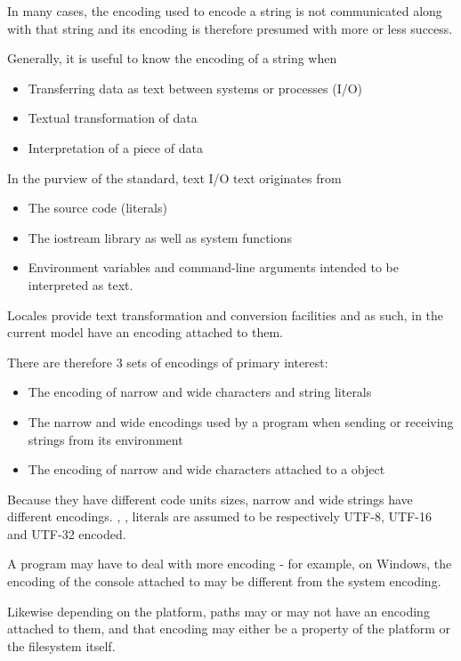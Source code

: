 \documentclass{wg21}
\begin{document}
In many cases, the encoding used to encode a string is not communicated along with that string and its
encoding is therefore presumed with more or less success.

Generally, it is useful to know the encoding of a string when

\begin{itemize}
    \item Transferring data as text between systems or processes (I/O)
    \item Textual transformation of data
    \item Interpretation of a piece of data
\end{itemize}

In the purview of the standard, text I/O text originates from
\begin{itemize}
    \item The source code (literals)
    \item The iostream library as well as system functions
    \item Environment variables and command-line arguments intended to be interpreted as text.
\end{itemize}

Locales provide text transformation and conversion facilities and as such, in the current model have an encoding attached to them.

There are therefore 3 sets of encodings of primary interest:

\begin{itemize}
    \item The encoding of narrow and wide characters and string literals
    \item The narrow and wide encodings used by a program when sending or receiving strings from its environment
    \item The encoding of narrow and wide characters attached to a  object
\end{itemize}

\note Because they have different code units sizes, narrow and wide strings have different encodings.
, ,  literals are assumed to be respectively UTF-8, UTF-16 and UTF-32 encoded.
\endnote

\note A program may have to deal with more encoding - for example, on Windows, the encoding of the console attached to  may be different from the system encoding.

Likewise depending on the platform, paths may or may not have an encoding attached to them, and that encoding may either be a property of the platform or the filesystem itself.
\endnote
\end{document}
